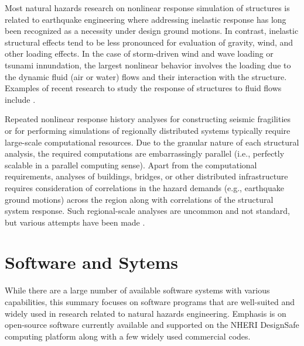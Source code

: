 Most natural hazards research on nonlinear response simulation of structures is related to earthquake engineering where addressing inelastic response has long been recognized as a necessity under design ground motions. In contrast, inelastic structural effects tend to be less pronounced for evaluation of gravity, wind, and other loading effects. In the case of storm-driven wind and wave loading or tsunami innundation, the largest nonlinear behavior involves the loading due to the dynamic fluid (air or water) flows and their interaction with the structure. Examples of recent research to study the response of structures to fluid flows include \cite{minjie2014modeling, minjie2018validation, ataei2015fragility, petrone2017fragility, madurapperuma2013response, attary2016methodology}.

Repeated nonlinear response history analyses for constructing seismic fragilities or for performing simulations of regionally distributed systems typically require large-scale computational resources. Due to the granular nature of each structural analysis, the required computations are embarrassingly parallel (i.e., perfectly scalable in a parallel computing sense). Apart from the computational requirements, analyses of buildings, bridges, or other distributed infrastructure requires consideration of correlations in the hazard demands (e.g., earthquake ground motions) across the region along with correlations of the structural system response. Such regional-scale analyses are uncommon and not standard, but various attempts have been made \citep[see e.g.][]{miller2015estimating}.

\section{Software and Sytems}
\label{sec:resp_struct_tools}

While there are a large number of available software systems with various capabilities, this summary focuses on software programs that are well-suited and widely used in research related to natural hazards engineering. Emphasis is on open-source software currently available and supported on the NHERI DesignSafe computing platform along with a few widely used commercial codes.

